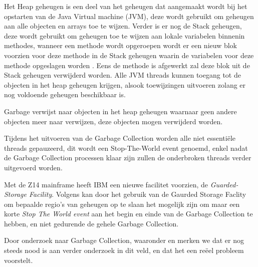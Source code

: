 Het Heap geheugen is een deel van het geheugen dat aangemaakt wordt bij het opstarten van de Java Virtual machine (JVM), deze wordt gebruikt om geheugen aan alle objecten en arrays toe te wijzen.
Verder is er nog de Stack geheugen, deze wordt gebruikt om geheugen toe te wijzen aan lokale variabelen binnenin methodes, wanneer een methode wordt opgeroepen wordt er een nieuw blok voorzien voor deze methode in de Stack geheugen waarin de variabelen voor deze methode opgeslagen worden \autocite{Cavanna2003}.
Eens de methode is afgewerkt zal deze blok uit de Stack geheugen verwijderd worden.
Alle JVM threads kunnen toegang tot de objecten in het heap geheugen krijgen, alsook toewijzingen uitvoeren zolang er nog voldoende geheugen beschikbaar is. 

Garbage verwijst naar objecten in het heap geheugen waarnaar geen andere objecten meer naar verwijzen, deze objecten mogen verwijderd worden.

Tijdens het uitvoeren van de Garbage Collection worden alle niet essentiële threads gepauzeerd, dit wordt een Stop-The-World event genoemd, enkel nadat de Garbage Collection processen klaar zijn zullen de onderbroken threads verder uitgevoerd worden\autocite{Grgic2018}.

Met de Z14 mainframe heeft IBM een nieuwe facilitet voorzien, de \textit{Guarded-Storage Facility}.
Volgens \textcite{Gracie} kan door het gebruik van de Gaurded Storage Faclity om bepaalde regio's van geheugen op te slaan het mogelijk zijn om maar een korte \textit{Stop The World event} aan het begin en einde van de Garbage Collection te hebben, en niet gedurende de gehele Garbage Collection.

Door onderzoek naar Garbage Collection, waaronder \textcite{Bruno2018} en \textcite{Nguyen2016} merken we dat er nog steeds nood is aan verder onderzoek in dit veld, en dat het een reëel probleem voorstelt.






